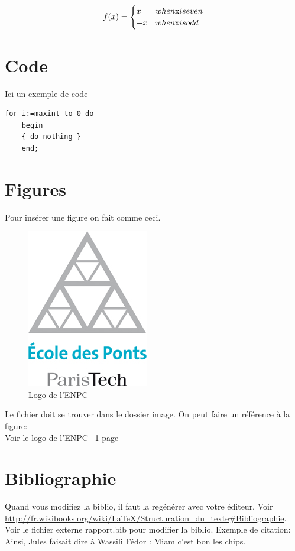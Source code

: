 \documentclass[twoside,10pt,openany,a4paper]{rapport}
\begin{document}
  \[
  f(x) = \begin{cases}
    x  & when $x$ is even\\
    -x & when $x$ is odd
  \end{cases}
  \]

  \section{Code}
  Ici un exemple de code
  \lstset{language=Pascal}
  \begin{lstlisting}[frame=single]
    for i:=maxint to 0 do
    begin
    { do nothing }
    end;
  \end{lstlisting}

  \section{Figures}
  Pour insérer une figure on fait comme ceci.\\
  \begin{figure}[h]
    \begin{center}
      \includegraphics[scale=0.5]{logo_enpc.jpg} %
      \caption{\label{logo} Logo de l'ENPC}
    \end{center}
  \end{figure}

  Le fichier doit se trouver dans le dossier image.
  On peut faire un référence à la figure:\\
  Voir le logo de l'ENPC ~\ref{logo} page~\pageref{logo}

  \section{Bibliographie}
  Quand vous modifiez la biblio, il faut la regénérer avec votre éditeur. Voir \url{http://fr.wikibooks.org/wiki/LaTeX/Structuration_du_texte#Bibliographie}.
  Voir le fichier externe rapport.bib pour modifier la biblio. Exemple de citation: Ainsi, Jules  faisait dire à Wassili Fédor \cite{Verne1875}: Miam c'est bon les chips.
\end{document}
